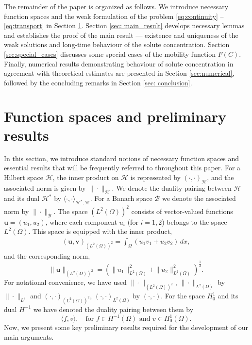 \documentclass[final,3p,times]{elsarticle}
\theoremstyle{plain}
\theoremstyle{remark}
\theoremstyle{plain}
\theoremstyle{remark}
\begin{document}
The remainder of the paper is organized as follows. We introduce necessary function spaces and the weak formulation of the problem \eqref{eq:continuity} -- \eqref{eq:transport} in Section \ref{sec:function_spaces}. Section \ref{sec: main_result} develops necessary lemmas and establishes the proof of the main result --- existence and uniqueness of the weak solutions and long-time behaviour of the solute concentration. Section \eqref{sec:special_cases} discusses some special cases of the mobility function $F(C)$.
Finally, numerical results demonstrating behaviour of solute concentration in agreement with theoretical estimates are presented in Section \eqref{sec:numerical}, followed by the concluding remarks in Section \ref{sec: conclusion}. 

\section{Function spaces and preliminary results} \label{sec:function_spaces}

In this section, we introduce standard notions of necessary function spaces and essential results that will be frequently referred to throughout this paper. 
For a Hilbert space \( \mathscr{H} \), the inner product on \( \mathscr{H} \) is represented by \( (\cdot, \cdot)_{\mathscr{H}} \), and the associated norm is given by \( \|\cdot\|_{\mathscr{H}} \). We denote the duality pairing between \( \mathscr{H}\) and its dual \( \mathscr{H}^* \) by \( \langle \cdot, \cdot \rangle_{\mathscr{H}^*,\mathscr{H}} \).  For a Banach space \( \mathscr{B} \) we denote the associated norm by \( \|\cdot\|_{\mathscr{B}} \). The space \( (L^2(\Omega))^2 \) consists of vector-valued functions \( \mathbf{u} = (u_1, u_2) \), where each component \( u_i \) (for \( i = 1,2 \)) belongs to the space \( L^2(\Omega) \). This space is equipped with the inner product,  
\begin{align}
    (\mathbf{u}, \mathbf{v})_{(L^2(\Omega))^2} = \int_{\Omega} \left( u_1 v_1 + u_2 v_2 \right) \, dx,
\end{align}
and the corresponding norm, 
\begin{equation}
    \label{eq:norm}
    \|\mathbf{u}\|_{(L^2(\Omega))^2} = \left( \|u_1\|_{L^2(\Omega)}^2 + \|u_2\|_{L^2(\Omega)}^2 \right)^{\frac{1}{2}}. 
\end{equation}
For notational convenience, we have used $\|\cdot\|_{(L^2(\Omega))^2}$, $\|\cdot\|_{L^2(\Omega)}$ by $\|\cdot\|_{L^2}$ and $(\cdot,\cdot)_{(L^2(\Omega))^2}$, $(\cdot,\cdot)_{L^2(\Omega)}$ by $(\cdot,\cdot)$.
For the space $H^1_0$ and its dual $H^{-1}$ we have denoted the duality pairing between them by \[
\langle f, v \rangle, \quad \text{for } f \in H^{-1}(\Omega) \text{ and } v \in H^1_0(\Omega).
\]
Now, we present some key preliminary results required for the development of our main arguments.
\end{document}
